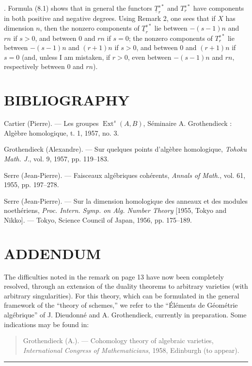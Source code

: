 \medskip
{}. Formula (8.1) shows that in general the functors
$\underline{T}_{r}^{s*}$ and $T_{r}^{s*}$ have components in both positive and
negative degrees. Using Remark 2, one sees that if $X$ has dimension $n$, then
the nonzero components of $\underline{T}_{r}^{s*}$ lie between $-(s-1)n$ and
$rn$ if $s>0$, and between $0$ and $rn$ if $s=0$; the nonzero components of
$T_{r}^{s*}$ lie between $-(s-1)n$ and $(r+1)n$ if $s>0$, and between $0$ and
$(r+1)n$ if $s=0$ (and, unless I am mistaken, if $r>0$, even between
$-(s-1)n$ and $rn$, respectively between $0$ and $rn$).

\section*{BIBLIOGRAPHY}

\noindent[1] Cartier (Pierre). --- Les groupes
$\operatorname{Ext}^{s}(A,B)$, Séminaire A. Grothendieck : Algèbre homologique,
t. 1, 1957, no. 3.

\noindent[2] Grothendieck (Alexandre). --- Sur quelques points d'algèbre
homologique, \emph{Tohoku Math. J.}, vol. 9, 1957, pp. 119--183.

\noindent[3] Serre (Jean-Pierre). --- Faisceaux algébriques cohérents,
\emph{Annals of Math.}, vol. 61, 1955, pp. 197--278.

\noindent[4] Serre (Jean-Pierre). --- Sur la dimension homologique des anneaux
et des modules noethériens, \emph{Proc. Intern. Symp. on Alg. Number Theory}
[1955, Tokyo and Nikko]. --- Tokyo, Science Council of Japan, 1956,
pp. 175--189.

\clearpage
{}
\section*{ADDENDUM}

The difficulties noted in the remark on page 13 have now been completely
resolved, through an extension of the duality theorems to arbitrary varieties
(with arbitrary singularities). For this theory, which can be formulated in
the general framework of the “theory of schemes,” we refer to the
“Éléments de Géométrie algébrique” of J. Dieudonné and A. Grothendieck,
currently in preparation. Some indications may be found in:

\begin{quote}
Grothendieck (A.). --- Cohomology theory of algebraic varieties,
\emph{International Congress of Mathematicians}, 1958, Edinburgh (to appear).
\end{quote}

\begin{flushright}
[April 1959]
\end{flushright}

\begin{center}\rule{36mm}{0.5pt}\end{center}

\par\smallskip
\begingroup\footnotesize
\endgroup
